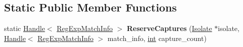 \subsection*{Static Public Member Functions}
\begin{DoxyCompactItemize}
\item 
\mbox{\label{classv8_1_1internal_1_1RegExpMatchInfo_a4fa5b36beda80a2878240111ddb2834b}} 
static \mbox{\hyperlink{classv8_1_1internal_1_1Handle}{Handle}}$<$ \mbox{\hyperlink{classv8_1_1internal_1_1RegExpMatchInfo}{Reg\+Exp\+Match\+Info}} $>$ {\bfseries Reserve\+Captures} (\mbox{\hyperlink{classv8_1_1internal_1_1Isolate}{Isolate}} $\ast$isolate, \mbox{\hyperlink{classv8_1_1internal_1_1Handle}{Handle}}$<$ \mbox{\hyperlink{classv8_1_1internal_1_1RegExpMatchInfo}{Reg\+Exp\+Match\+Info}} $>$ match\+\_\+info, \mbox{\hyperlink{classint}{int}} capture\+\_\+count)
\end{DoxyCompactItemize}
